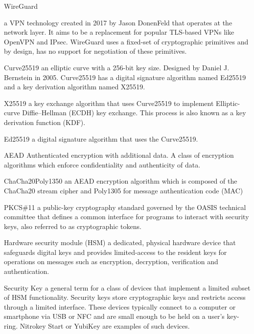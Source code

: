 \documentclass [11pt, proquest] {uwthesis}[2020/02/24]
\begin{document}
\begin{glossary}

\item[WireGuard]

a VPN technology created in 2017 by Jason DonenFeld that operates at the network layer. It aims to be a replacement for popular TLS-based VPNs like OpenVPN and IPsec. WireGuard uses a fixed-set of cryptographic primitives and by design, has no support for negotiation of these primitives. 

\item[Curve25519]
an elliptic curve with a 256-bit key size. Designed by Daniel J. Bernstein in 2005\cite{bernstein_curve25519_2005}. 
Curve25519 has a digital signature algorithm named Ed25519 and a key derivation algorithm named X25519.

\item[X25519]
a key exchange algorithm that uses Curve25519 to implement Elliptic-curve Diffie–Hellman (ECDH) key exchange. This process is also known as a key derivation function (KDF).

\item[Ed25519] a digital signature algorithm that uses the Curve25519.

\item[AEAD]
Authenticated encryption with additional data. A class of encryption algorithms which enforce confidentiality and authenticity of data. 

\item[ChaCha20Poly1350]
an AEAD encryption algorithm which is composed of the ChaCha20 stream cipher and Poly1305 for message authentication code (MAC)

\item[PKCS\#11] a public-key cryptography standard governed by the OASIS technical committee\cite{noauthor_cryptsoft_2020} that defines a common interface for programs to interact with security keys, also referred to as cryptographic tokens.

\item[Hardware security module]
(HSM) a dedicated, physical hardware device that safeguards digital keys and provides limited-access to the resident keys for operations on messages such as encryption, decryption, verification and authentication. 

\item[Security Key]
a general term for a class of devices that implement a limited subset of HSM functionality. Security keys store cryptographic keys and restricts access through a limited interface. These devices typically connect to a computer or smartphone via USB or NFC and are small enough to be held on a user's key-ring.
Nitrokey Start\cite{noauthor_nitrokey_nodate} or YubiKey\cite{noauthor_discover_nodate}\cite{noauthor_u2f_nodate-1} are examples of such devices.

\end{glossary}
\end{document}
